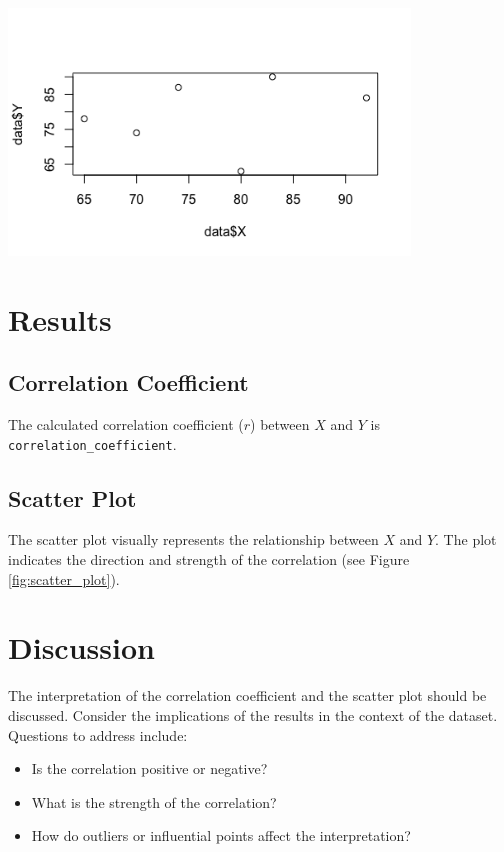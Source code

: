 \documentclass[10pt]{book}
\begin{document}
\begin{enumerate}
        \includegraphics[width=0.8\textwidth]{scatter_plot.png}

    
    
\end{enumerate}

\section{Results}

\subsection{Correlation Coefficient}

The calculated correlation coefficient (\(r\)) between \(X\) and \(Y\) is \texttt{correlation\_coefficient}.

\subsection{Scatter Plot}

The scatter plot visually represents the relationship between \(X\) and \(Y\). The plot indicates the direction and strength of the correlation (see Figure \ref{fig:scatter_plot}).

\section{Discussion}

The interpretation of the correlation coefficient and the scatter plot should be discussed. Consider the implications of the results in the context of the dataset. Questions to address include:

\begin{itemize}
    \item Is the correlation positive or negative?
    \item What is the strength of the correlation?
    \item How do outliers or influential points affect the interpretation?
\end{itemize}
\end{document}
